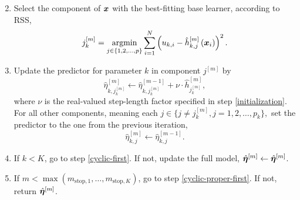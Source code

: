 \begin{algorithm}
\begin{enumerate}
\begin{equation*}
        \end{equation*}
    \item
        Select the component of $\bm{x}$ with the best-fitting base learner, according to RSS,
        \begin{equation*}
            j_k^{[m]}=\operatorname*{argmin}_{j\in\{1,2,\ldots,p\}}\sum_{i=1}^N \left(u_{k,i}-\hat{h}_{k,j}^{[m]}\left(\bm{x}_{i}\right)\right)^2.
        \end{equation*}
    \item
        Update the predictor for parameter $k$ in component $j^{[m]}$ by
        \begin{equation*}
            \hat{\eta}_{k,j_k^{[m]}}^{[m]}\gets\hat{\eta}_{k,j_k^{[m]}}^{[m-1]}+\nu\cdot\hat{h}_{j_k^{[m]}}^{[m]},
        \end{equation*}
        where $\nu$ is the real-valued step-length factor specified in step \ref{initialization}. For all other components,
        meaning each $j\in\{j\neq j_k^{[m]},j=1,2,\ldots,p_k\},$ set the predictor to the one from the previous iteration,
        \begin{equation*}
            \hat{\eta}_{k,j}^{[m]}\gets\hat{\eta}_{k,j}^{[m-1]}.
        \end{equation*}
    \item
        \label{cyclic-last}
        If $k<K$, go to step \ref{cyclic-first}. If not, update the full model, $\hat{\boldsymbol{\eta}}^{[m]}\gets\hat{\boldsymbol{\eta}}^{[m]}$.
    \item
        If $m<\max(m_{\text{stop},1},\ldots,m_{\text{stop},K})$, go to step \ref{cyclic-proper-first}.
        If not, return $\hat{\boldsymbol{\eta}}^{[m]}$.
\end{enumerate}
\end{algorithm}

